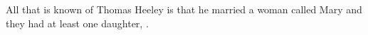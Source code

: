 
All that is known of Thomas Heeley is that he married a woman called Mary and they had at least one daughter, .
